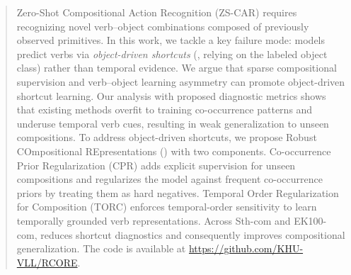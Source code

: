 \begin{abstract}








Zero-Shot Compositional Action Recognition (ZS-CAR) requires recognizing novel verb--object combinations composed of previously observed primitives.
In this work, we tackle a key failure mode: models predict verbs via \emph{object-driven shortcuts} (\ie, relying on the labeled object class) rather than temporal evidence.
We argue that sparse compositional supervision and verb--object learning asymmetry can promote object-driven shortcut learning.
Our 
analysis with proposed diagnostic metrics
shows that existing methods overfit to training co-occurrence patterns and underuse temporal verb cues, resulting in weak generalization to unseen compositions.
To address object-driven shortcuts, we propose Robust COmpositional REpresentations (\ours{}) with two components.
Co-occurrence Prior Regularization (CPR) adds explicit supervision for unseen compositions and regularizes the model against frequent co-occurrence priors by treating them as hard negatives.
Temporal Order Regularization for Composition (TORC) enforces temporal-order sensitivity to learn temporally grounded verb representations.
Across Sth-com and EK100-com, 
\ours{} reduces shortcut diagnostics and consequently improves compositional generalization.
The code is available at \href{https://github.com/KHU-VLL/RCORE}{https://github.com/KHU-VLL/RCORE}.

\end{abstract}
